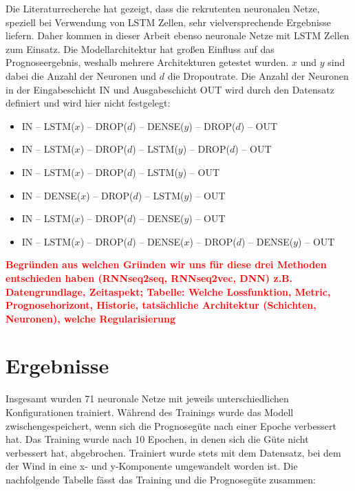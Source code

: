 \documentclass[
12pt, %
toc=listofnumbered, %
toc=chapterentrydotfill, %
numbers=noenddot, %
captions=tableheading, %
bibliography=numbered
]{scrreprt}
\let\Oldsection\section
\renewcommand{\section}{\FloatBarrier\Oldsection}
\newcommand{\highlight}[1]{\textbf{\textcolor{red}{#1}}}
\begin{document}
\begin{itemize}
\begin{itemize}
		Die Literaturrecherche hat gezeigt, dass die rekrutenten neuronalen Netze, speziell bei Verwendung von LSTM Zellen, sehr vielversprechende Ergebnisse liefern. Daher kommen in dieser Arbeit ebenso neuronale Netze mit LSTM Zellen zum Einsatz. Die Modellarchitektur hat großen Einfluss auf das Prognoseergebnis, weshalb mehrere Architekturen getestet wurden. $x$ und $y$ sind dabei die Anzahl der Neuronen und $d$ die Dropoutrate. Die Anzahl der Neuronen in der Eingabeschicht IN und Ausgabeschicht OUT wird durch den Datensatz definiert und wird hier nicht festgelegt:

		\begin{itemize}
			\item IN – LSTM($x$) – DROP($d$) – DENSE($y$) – DROP($d$) – OUT
			\item IN – LSTM($x$) – DROP($d$) – LSTM($y$) – DROP($d$) – OUT
			\item IN – LSTM($x$) – DROP($d$) – LSTM($y$) – OUT
			\item IN – DENSE($x$) – DROP($d$) – LSTM($y$) – OUT
			\item IN – LSTM($x$) – DROP($d$) – DENSE($y$) – OUT
			\item IN – LSTM($x$) – DROP($d$) – DENSE($x$) – DROP($d$) – DENSE($y$) – OUT

		\end{itemize}


		
	\end{itemize}
\end{itemize}

\highlight{Begründen aus welchen Gründen wir uns für diese drei Methoden entschieden haben 
(RNNseq2seq, RNNseq2vec, DNN) z.B. Datengrundlage, Zeitaspekt; 
Tabelle: Welche Lossfunktion, Metric, Prognosehorizont, Historie, tatsächliche Architektur (Schichten, Neuronen), 
welche Regularisierung}

\section{Ergebnisse}\label{section:ergebnisse_training}
Insgesamt wurden 71 neuronale Netze mit jeweils unterschiedlichen Konfigurationen trainiert. Während des Trainings wurde das Modell zwischengespeichert, wenn sich die Prognosegüte nach einer Epoche verbessert hat. Das Training wurde nach 10 Epochen, in denen sich die Güte nicht verbessert hat, abgebrochen. Trainiert wurde stets mit dem Datensatz, bei dem der Wind in eine x- und y-Komponente umgewandelt worden ist. Die nachfolgende Tabelle fässt das Training und die Prognosegüte zusammen:
\end{document}
